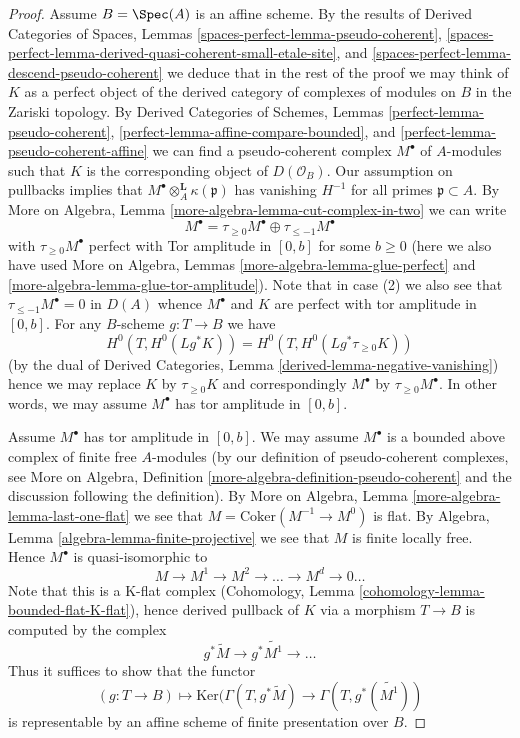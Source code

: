 \begin{proof}
\medskip\noindent
Assume $B = \Spec(A)$ is an affine scheme. By the results of
Derived Categories of Spaces, Lemmas
\ref{spaces-perfect-lemma-pseudo-coherent},
\ref{spaces-perfect-lemma-derived-quasi-coherent-small-etale-site}, and
\ref{spaces-perfect-lemma-descend-pseudo-coherent}
we deduce that in the rest of the proof we may think of $K$ as a perfect
object of the derived category of complexes of modules on $B$
in the Zariski topology. By 
Derived Categories of Schemes, Lemmas
\ref{perfect-lemma-pseudo-coherent},
\ref{perfect-lemma-affine-compare-bounded}, and
\ref{perfect-lemma-pseudo-coherent-affine} we can find a pseudo-coherent
complex $M^\bullet$ of $A$-modules such that $K$ is the corresponding
object of $D(\mathcal{O}_B)$. Our assumption on pullbacks implies
that $M^\bullet \otimes^\mathbf{L}_A \kappa(\mathfrak p)$
has vanishing $H^{-1}$ for all primes $\mathfrak p \subset A$.
By More on Algebra, Lemma \ref{more-algebra-lemma-cut-complex-in-two}
we can write
$$
M^\bullet =
\tau_{\geq 0}M^\bullet \oplus \tau_{\leq - 1}M^\bullet
$$
with $\tau_{\geq 0}M^\bullet$ perfect with Tor amplitude in $[0, b]$
for some $b \geq 0$ (here we also have used
More on Algebra, Lemmas \ref{more-algebra-lemma-glue-perfect} and
\ref{more-algebra-lemma-glue-tor-amplitude}).
Note that in case (2) we also see that $\tau_{\leq - 1}M^\bullet = 0$
in $D(A)$ whence $M^\bullet$ and $K$ are perfect with
tor amplitude in $[0, b]$. For any $B$-scheme $g : T \to B$ we have
$$
H^0(T, H^0(Lg^*K)) = H^0(T, H^0(Lg^*\tau_{\geq 0}K))
$$
(by the dual of Derived Categories, Lemma
\ref{derived-lemma-negative-vanishing})
hence we may replace $K$ by $\tau_{\geq 0}K$ and correspondingly
$M^\bullet$ by $\tau_{\geq 0}M^\bullet$. In other words, we may
assume $M^\bullet$ has tor amplitude in $[0, b]$.

\medskip\noindent
Assume $M^\bullet$ has tor amplitude in $[0, b]$.
We may assume $M^\bullet$ is a bounded above complex of finite free
$A$-modules (by our definition of pseudo-coherent complexes, see
More on Algebra, Definition \ref{more-algebra-definition-pseudo-coherent}
and the discussion following the definition).
By More on Algebra, Lemma \ref{more-algebra-lemma-last-one-flat}
we see that $M = \text{Coker}(M^{- 1} \to M^0)$ is flat. By
Algebra, Lemma \ref{algebra-lemma-finite-projective} we see that $M$
is finite locally free. Hence $M^\bullet$ is quasi-isomorphic to
$$
M \to M^1 \to M^2 \to \ldots \to M^d \to 0 \ldots
$$
Note that this is a K-flat complex
(Cohomology, Lemma \ref{cohomology-lemma-bounded-flat-K-flat}),
hence derived pullback of $K$ via a morphism $T \to B$ is computed
by the complex
$$
g^*\widetilde{M} \to g^*\widetilde{M^1} \to \ldots
$$
Thus it suffices to show that the functor
$$
(g : T \to B) \longmapsto
\text{Ker}(
\Gamma(T,g^*\widetilde{M})
\to
\Gamma(T, g^*(\widetilde{M^1})
)
$$
is representable by an affine scheme of finite presentation over $B$.


\end{proof}
